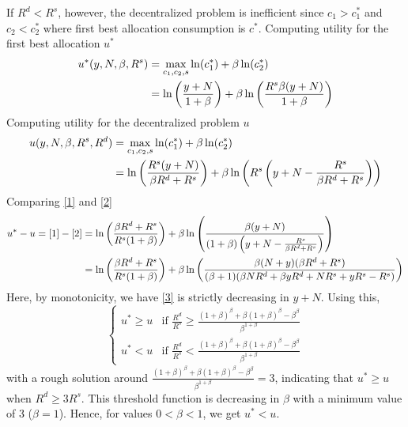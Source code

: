 \documentclass[12pt]{article}
\begin{document}
\begin{enumerate}
\begin{enumerate}
        If $R^d<R^s$, however, the decentralized problem is inefficient since $c_1>c_1^*$ and $c_2<c_2^*$ where first best allocation consumption is $c^*$. Computing utility for the first best allocation $u^*$ 
        \begin{align}
            u^*(y,N,\beta,R^s)&= \max_{c_1,c_2,s} \ln(c_1^*) + \beta \ln(c_2^*) \notag 
            \\ &= \ln\left(\frac{y+N}{1+\beta}\right) + \beta \ln\left(\frac{R^s \beta (y+N)}{1+\beta}\right)\label{1}
        \end{align}
         Computing utility for the decentralized problem $u$
         \begin{align}
             u(y,N,\beta,R^s,R^d)&= \max_{c_1,c_2,s} \ln(c_1^*) + \beta \ln(c_2^*) \notag 
             \\ &= \ln\left( \frac{R^s(y+N)}{\beta R^d + R^s} \right) + \beta \ln\left( R^s \left( y+N - \frac{R^s}{\beta R^d + R^s} \right)\right) \label{2}
         \end{align}
         Comparing \eqref{1} and \eqref{2}
         \begin{align}
              u^* - u =  \eqref{1} - \eqref{2} &=  \ln\left(\frac{\beta R^d + R^s}{R^s(1+\beta)}  \right) + \beta \notag \ln\left(\frac{\beta (y+N)}{(1+\beta) \left( y+N - \frac{R^s}{\beta R^d + R^s} \right)} \right)
               \\ &= \ln\left(\frac{\beta R^d + R^s}{R^s(1+\beta)}  \right) + \beta \ln\left(\frac{\beta (N + y) (\beta R^d + R^s)}{(\beta + 1) (\beta N R^d + \beta y R^d + N R^s + y R^s - R^s)}\right)\label{3}
         \end{align}
         Here, by monotonicity, we have \eqref{3} is strictly decreasing in $y+N$. Using this, 
         \[ \begin{cases}
             u^* \geq u & \text{if } \frac{R^d}{R^s} \geq  \frac{ (1 + \beta)^\beta + \beta (1 + \beta)^\beta-\beta^\beta}{\beta^{1 + \beta}}
             \\ u^* < u & \text{if }  \frac{R^d}{R^s} < \frac{ (1 + \beta)^\beta + \beta (1 + \beta)^\beta-\beta^\beta}{\beta^{1 + \beta}}
         \end{cases}\]
         with a rough solution around $ \frac{ (1 + \beta)^\beta + \beta (1 + \beta)^\beta-\beta^\beta}{\beta^{1 + \beta}}=3$, indicating that $u^* \geq u$ when $R^d \geq 3 R^s.$         
         This threshold function is decreasing in $\beta$ with a minimum value of 3 ($\beta=1$). Hence, for values $0< \beta < 1$, we get $u^* < u$.


\end{enumerate}
\end{enumerate}
\end{document}
